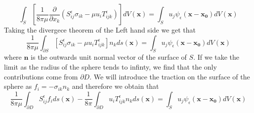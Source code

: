 \begin{equation*}
  \int_{S} \left[\frac{1}{8\pi\mu}\frac{\partial}{\partial x_k}(S^\epsilon_{ij}\sigma_{ik} - \mu u_i T^\epsilon_{ijk})\right] dV(\mathbf{x}) = \int_{S} u_j\psi_\epsilon(\mathbf{x}-\mathbf{x_0}) dV(\mathbf{x})
\end{equation*}
Taking the divergece theorem of the Left hand side we get that
\begin{equation*}
  \frac{1}{8\pi\mu}\int_{\partial S} \left[S^\epsilon_{ij}\sigma_{ik} - \mu u_i T^\epsilon_{ijk}\right]n_k ds(\mathbf{x}) = \int_{S} u_j\psi_\epsilon(\mathbf{x}-\mathbf{x_0}) dV(\mathbf{x})
\end{equation*}
where $\mathbf{n}$ is the outwards unit normal vector of the surface of $S$. If we take the limit as the radius of the sphere tends to infinty, we find that the only contributions come from $\partial D$. We will introduce the traction on the surface of the sphere as $f_i = -\sigma_{ik}n_k$ and therefore we obtain that
\begin{equation}
  \label{eq:BIE3}
    \frac{1}{8\pi\mu}\int_{\partial D} S^\epsilon_{ij}f_i ds(\mathbf{x}) - \frac{1}{8\pi}\int_{\partial D} u_i T^\epsilon_{ijk}n_k ds(\mathbf{x}) = \int_{S} u_j\psi_\epsilon(\mathbf{x}-\mathbf{x_0}) dV(\mathbf{x})
\end{equation}

